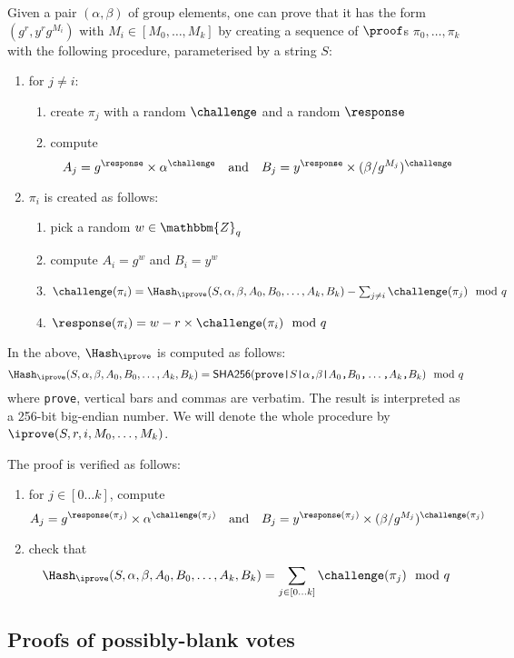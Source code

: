 \documentclass[a4paper]{article}
\newcommand{\Z}{\mathbbm{Z}}
\newcommand{\shatwo}{\textsf{SHA256}}
\begin{document}
Given a pair $(\alpha,\beta)$ of group elements, one can prove that it
has the form $(g^r,y^rg^{M_i})$ with $M_i\in[M_0,\dots,M_k]$ by
creating a sequence of $\proof$s $\pi_0,\dots,\pi_k$ with the
following procedure, parameterised by a string $S$:
\begin{enumerate}
\item for $j\neq i$:
  \begin{enumerate}
  \item create $\pi_j$ with a random $\challenge$ and a random
    $\response$
  \item compute
    \[A_j={g^\response}\times{\alpha^\challenge}\quad\text{and}\quad
    B_j={y^\response}\times{(\beta/g^{M_j})^\challenge}\]
  \end{enumerate}
\item $\pi_i$ is created as follows:
  \begin{enumerate}
  \item pick a random $w\in\Z_q$
  \item compute $A_i=g^w$ and $B_i=y^w$
  \item $\challenge(\pi_i)=\Hash_\iprove(S,\alpha,\beta,A_0,B_0,\dots,A_k,B_k)-\sum_{j\neq
      i}\challenge(\pi_j)\mod q$
  \item $\response(\pi_i)=w-r\times\challenge(\pi_i)\mod q$
  \end{enumerate}
\end{enumerate}
In the above, $\Hash_\iprove$ is computed as follows:
\[\Hash_\iprove(S,\alpha,\beta,A_0,B_0,\dots,A_k,B_k)=\shatwo(\verb=prove|=S\verb=|=\alpha\verb=,=\beta\verb=|=A_0\verb=,=B_0\verb=,=\dots\verb=,=A_k\verb=,=B_k)\mod q\]
where \verb=prove=, vertical bars and commas are verbatim.
The result is interpreted as a 256-bit
big-endian number. We will denote the whole procedure by
$\iprove(S,r,i,M_0,\dots,M_k)$.

The proof is verified as follows:
\begin{enumerate}
\item for $j\in[0\dots k]$, compute
  \[A_j={g^{\response(\pi_j)}}\times{\alpha^{\challenge(\pi_j)}}\quad\text{and}\quad
  B_j={y^{\response(\pi_j)}}\times{(\beta/g^{M_j})^{\challenge(\pi_j)}}\]
\item check that
  \[\Hash_\iprove(S,\alpha,\beta,A_0,B_0,\dots,A_k,B_k)=\sum_{j\in[0\dots
    k]}\challenge(\pi_j)\mod q\]
\end{enumerate}

\subsection{Proofs of possibly-blank votes}
\label{bproof}
\end{document}
